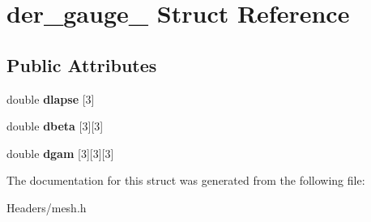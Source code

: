 \hypertarget{structder__gauge__}{}\section{der\+\_\+gauge\+\_\+ Struct Reference}
\label{structder__gauge__}
\subsection*{Public Attributes}
\begin{DoxyCompactItemize}
\item 
\mbox{\label{structder__gauge___afa504e7ba14279165bd18fd9cbb33ac6}} 
double {\bfseries dlapse} \mbox{[}3\mbox{]}
\item 
\mbox{\label{structder__gauge___aae8d32dd87504b7523d632d462510e6f}} 
double {\bfseries dbeta} \mbox{[}3\mbox{]}\mbox{[}3\mbox{]}
\item 
\mbox{\label{structder__gauge___a278b94d51ba7ce283544f0a2784bbf6b}} 
double {\bfseries dgam} \mbox{[}3\mbox{]}\mbox{[}3\mbox{]}\mbox{[}3\mbox{]}
\end{DoxyCompactItemize}


The documentation for this struct was generated from the following file\+:\begin{DoxyCompactItemize}
\item 
Headers/mesh.\+h\end{DoxyCompactItemize}
